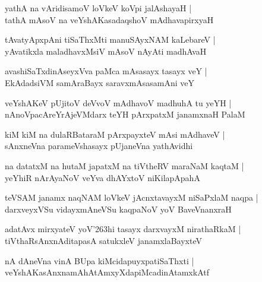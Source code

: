 \documentclass[twoside,12pt,openright]{book}
\def\S{\char'263}
\newcounter{shloka}[chapter]
\begin{document}
\begin{shloka}%
yathA na vAridisamoV loVkeV koVpi jalAshayaH |\\
tathA mAsoV na veYshAKasadaqshoV mAdhavapirxyaH 
\end{shloka}

\begin{shloka}%
tAvatyApxpAni tiSaThxMti manuSAyxNAM kaLebareV |\\
yAvatikxla maladhavxMsiV mAsoV nAyAti madhAvaH 
\end{shloka}

\begin{shloka}%
avashiSaTxdinAseyxVva paMca mAsasayx tasayx veY |\\
EkAdadsiVM samAraBayx saravxmAsasamAni veY 
\end{shloka}

\begin{shloka}%
veYshAKeV pUjitoV deVvoV mAdhavoV madhuhA tu yeYH |\\
nAnoVpacAreYrAjeVMdarx teYH pArxpatxM  janamxnaH PalaM
\end{shloka}

\begin{shloka}%
kiM kiM na dulaRBataraM pArxpayxteV mAsi mAdhaveV |\\
sAnxneVna parameVshasayx pUjaneVna yathAvidhi
\end{shloka}

\begin{shloka}%
na datatxM na hutaM japatxM na tiVtheRV maraNaM kaqtaM |\\
yeYhiR nArAyaNoV veYva dhAYxtoV niKilapApahA 
\end{shloka}

\begin{shloka}%
teVSAM janamx naqNAM loVkeV jAcnxtavayxM niSaPxlaM naqpa |\\
darxveyxVSu vidayxmAneVSu kaqpaNoV yoV BaveVnanxraH 
\end{shloka}

\begin{shloka}%
adatAvx mirxyateV yoV\S hi tasayx darxvayxM nirathaRkaM |\\
tiVthaRsAnxnAditapasA satukxleV janamxlaBayxteV 
\end{shloka}

\begin{shloka}%
nA dAneVna vinA BUpa kiMcidapuyxpatiSaThxti |\\
veYshAKasAnxnamAhAtAmxyXdapiMcadinAtamxkAtf
\end{shloka}
\end{document}
